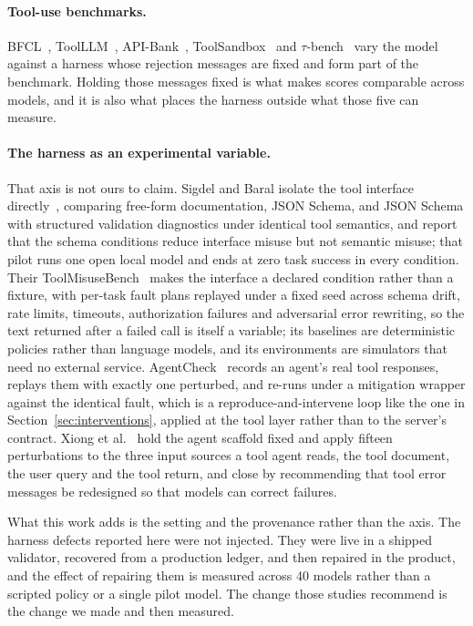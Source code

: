 \documentclass[11pt]{article}
\begin{document}
\paragraph{Tool-use benchmarks.}
BFCL~\cite{patil2025bfcl}, ToolLLM~\cite{qin2024toolllm}, API-Bank~\cite{li2023apibank},
ToolSandbox~\cite{lu2024toolsandbox} and $\tau$-bench~\cite{yao2024taubench} vary the model against a harness
whose rejection messages are fixed and form part of the benchmark. Holding those messages fixed is what makes
scores comparable across models, and it is also what places the harness outside what those five can measure.

\paragraph{The harness as an experimental variable.}
That axis is not ours to claim. Sigdel and Baral isolate the tool interface
directly~\cite{sigdel2026schemafirst}, comparing free-form documentation, JSON Schema, and JSON Schema with
structured validation diagnostics under identical tool semantics, and report that the schema conditions reduce
interface misuse but not semantic misuse; that pilot runs one open local model and ends at zero task success in
every condition. Their ToolMisuseBench~\cite{sigdel2026toolmisuse} makes the interface a declared condition
rather than a fixture, with per-task fault plans replayed under a fixed seed across schema drift, rate limits,
timeouts, authorization failures and adversarial error rewriting, so the text returned after a failed call is
itself a variable; its baselines are deterministic policies rather than language models, and its environments are
simulators that need no external service. AgentCheck~\cite{mazumder2026agentcheck} records an agent's real tool
responses, replays them with exactly one perturbed, and re-runs under a mitigation wrapper against the identical
fault, which is a reproduce-and-intervene loop like the one in Section~\ref{sec:interventions}, applied at the
tool layer rather than to the server's contract. Xiong et al.~\cite{xiong2025butterfly} hold the agent scaffold
fixed and apply fifteen perturbations to the three input sources a tool agent reads, the tool document, the user
query and the tool return, and close by recommending that tool error messages be redesigned so that models can
correct failures.

What this work adds is the setting and the provenance rather than the axis. The harness defects reported here
were not injected. They were live in a shipped validator, recovered from a production ledger, and then repaired
in the product, and the effect of repairing them is measured across 40 models rather than a scripted policy or a
single pilot model. The change those studies recommend is the change we made and then measured.
\end{document}

